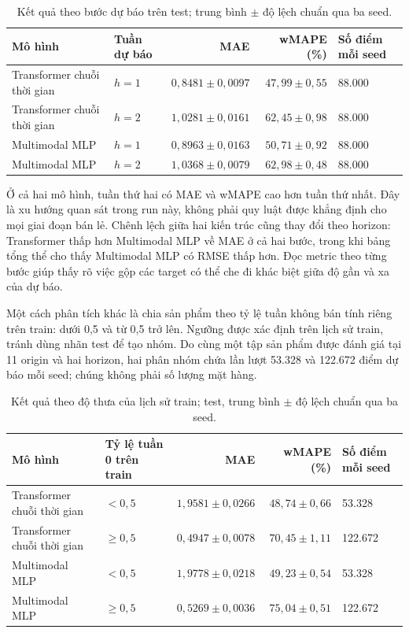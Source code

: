 \documentclass[12pt,a4paper,oneside]{article}
\begin{document}
\begin{table}[!htbp]
\centering
\small
\caption{Kết quả theo bước dự báo trên test; trung bình $\pm$ độ lệch chuẩn qua ba seed.}
\label{tab:horizon-results}
\begin{tabularx}{\textwidth}{p{}p{}rrX}
\toprule
Mô hình & Tuần dự báo & MAE & wMAPE (\%) & Số điểm mỗi seed \\
\midrule
Transformer chuỗi thời gian & $h=1$ & $0,8481\pm0,0097$ & $47,99\pm0,55$ & 88.000 \\
Transformer chuỗi thời gian & $h=2$ & $1,0281\pm0,0161$ & $62,45\pm0,98$ & 88.000 \\
Multimodal MLP & $h=1$ & $0,8963\pm0,0163$ & $50,71\pm0,92$ & 88.000 \\
Multimodal MLP & $h=2$ & $1,0368\pm0,0079$ & $62,98\pm0,48$ & 88.000 \\
\bottomrule
\end{tabularx}
\end{table}

Ở cả hai mô hình, tuần thứ hai có MAE và wMAPE cao hơn tuần thứ nhất. Đây là xu hướng quan sát trong run này, không phải quy luật được khẳng định cho mọi giai đoạn bán lẻ. Chênh lệch giữa hai kiến trúc cũng thay đổi theo horizon: Transformer thấp hơn Multimodal MLP về MAE ở cả hai bước, trong khi bảng tổng thể cho thấy Multimodal MLP có RMSE thấp hơn. Đọc metric theo từng bước giúp thấy rõ việc gộp các target có thể che đi khác biệt giữa độ gần và xa của dự báo.

Một cách phân tích khác là chia sản phẩm theo tỷ lệ tuần không bán tính riêng trên train: dưới 0,5 và từ 0,5 trở lên. Ngưỡng được xác định trên lịch sử train, tránh dùng nhãn test để tạo nhóm. Do cùng một tập sản phẩm được đánh giá tại 11 origin và hai horizon, hai phân nhóm chứa lần lượt 53.328 và 122.672 điểm dự báo mỗi seed; chúng không phải số lượng mặt hàng.

\begin{table}[!htbp]
\centering
\small
\caption{Kết quả theo độ thưa của lịch sử train; test, trung bình $\pm$ độ lệch chuẩn qua ba seed.}
\label{tab:sparsity-results}
\begin{tabularx}{\textwidth}{p{}p{}rrX}
\toprule
Mô hình & Tỷ lệ tuần 0 trên train & MAE & wMAPE (\%) & Số điểm mỗi seed \\
\midrule
Transformer chuỗi thời gian & $<0,5$ & $1,9581\pm0,0266$ & $48,74\pm0,66$ & 53.328 \\
Transformer chuỗi thời gian & $\geq0,5$ & $0,4947\pm0,0078$ & $70,45\pm1,11$ & 122.672 \\
Multimodal MLP & $<0,5$ & $1,9778\pm0,0218$ & $49,23\pm0,54$ & 53.328 \\
Multimodal MLP & $\geq0,5$ & $0,5269\pm0,0036$ & $75,04\pm0,51$ & 122.672 \\
\bottomrule
\end{tabularx}
\end{table}
\end{document}
